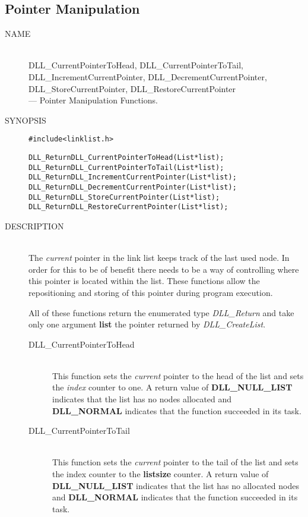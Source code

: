 \documentclass[10pt,letterpaper,titlepage]{article}
\begin{document}
\subsection{Pointer Manipulation}
\begin{description}
\item[NAME]\quad\\
DLL\_CurrentPointerToHead, DLL\_CurrentPointerToTail,\\
DLL\_IncrementCurrentPointer, DLL\_DecrementCurrentPointer,\\
DLL\_StoreCurrentPointer, DLL\_RestoreCurrentPointer\\
  --- Pointer Manipulation Functions.

\item[SYNOPSIS]
\begin{alltt}

#include <linklist.h>

DLL_Return DLL_CurrentPointerToHead(List *list);
DLL_Return DLL_CurrentPointerToTail(List *list);
DLL_Return DLL_IncrementCurrentPointer(List *list);
DLL_Return DLL_DecrementCurrentPointer(List *list);
DLL_Return DLL_StoreCurrentPointer(List *list);
DLL_Return DLL_RestoreCurrentPointer(List *list);
\end{alltt}

\item[DESCRIPTION]\quad\\
The \emph{current} pointer in the link list keeps track of the last used node.  In order for this to be of benefit there needs to be a way of controlling where this pointer is located within the list.  These functions allow the repositioning and storing of this pointer during program execution.
\vspace{8pt}

\noindent
All of these functions return the enumerated type \emph{DLL\_Return} and take only one argument \textbf{list} the pointer returned by \emph{DLL\_CreateList}.

 \begin{description}
 \item[DLL\_CurrentPointerToHead]\quad\\
 This function sets the \emph{current} pointer to the head of the list and sets the \emph{index} counter to one.  A return value of \textbf{DLL\_NULL\_LIST} indicates that the list has no nodes allocated and \textbf{DLL\_NORMAL} indicates that the function succeeded in its task.

 \item[DLL\_CurrentPointerToTail]\quad\\
 This function sets the \emph{current} pointer to the tail of the list and sets the index counter to the \textbf{listsize} counter.  A return value of \textbf{DLL\_NULL\_LIST} indicates that the list has no allocated nodes and \textbf{DLL\_NORMAL} indicates that the function succeeded in its task.


\end{description}
\end{description}
\end{document}
